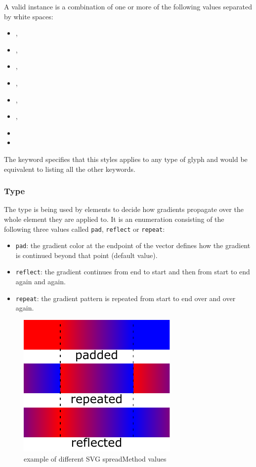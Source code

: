 A valid \StyleType instance is a combination of one or more of the following 
values separated by white spaces:

\begin{itemize}
 \item {},
 \item {},
 \item {}, 
 \item {},
 \item {}, 
 \item {}, 
 \item {} 
 \item {}
\end{itemize}

The  keyword specifies that this styles applies to any type of glyph and 
would be equivalent to listing all the other keywords. 

\subsubsection{Type \fixttspace{}}

The type \GradientSpreadMethod is being used by \GradientBase elements to decide how 
gradients propagate over the whole element they are applied to. It is an enumeration consisting 
of the following three values called \texttt{pad}, \texttt{reflect} or \texttt{repeat}:

\begin{itemize}
 \item {\texttt{pad}:} the gradient color at the
endpoint of the vector defines how the gradient is continued beyond that point (default value).
 \item {\texttt{reflect}:} the gradient continues from end to start and
then from start to end again and again.
 \item {\texttt{repeat}:} the gradient pattern is repeated from start to end over and over again.
\end{itemize}

\begin{figure}[!ht]
\begin{center}
\includegraphics{figures/SVG_spreadMethod.pdf}
\end{center}
\caption{example of different SVG spreadMethod values}
\label{SVG:spreadMethod}
\end{figure}

